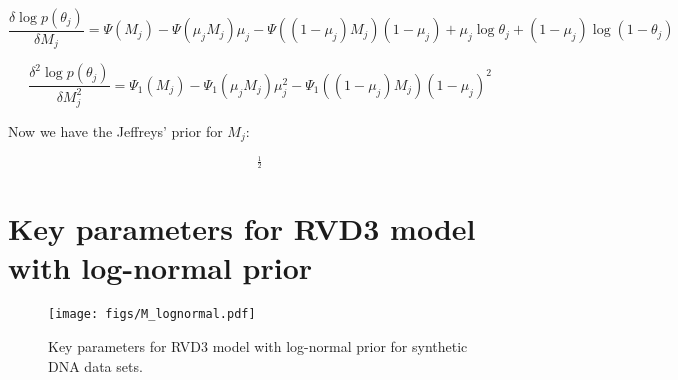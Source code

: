 \documentclass[11pt,reqno]{amsart}
\begin{document}
\begin{equation}
\frac{\delta\log p(\theta_{j})}{\delta M_{j}} = \Psi(M_{j}) - \Psi(\mu_{j} M_{j})\mu_{j} - \Psi((1-\mu_{j})M_{j})(1-\mu_{j}) +\mu_{j}\log\theta_{j} + (1-\mu_{j})\log(1-\theta_{j})
\end{equation}

\begin{equation}
\frac{\delta^{2}\log p(\theta_{j})}{\delta M_{j}^{2}}  = \Psi_{1}(M_{j}) - \Psi_{1}(\mu_{j} M_{j})\mu_{j}^{2} - \Psi_{1}((1-\mu_{j})M_{j})(1-\mu_{j})^{2}
\end{equation}

Now we have the Jeffreys' prior for $M_{j}$:

\begin{equation}
[-\left(\Psi_{1}(M_{j}) - \Psi_{1}(\mu_{j} M_{j})\mu_{j}^{2} - \Psi_{1}((1-\mu_{j})M_{j}){(1-\mu_{j})^{2}}\right)]^{\frac{1}{2}}
\end{equation}

\section{Key parameters for RVD3 model with log-normal prior}\label{sec:appendix_mom}
\begin{figure}[htbp]
\begin{center}
\texttt{[image: figs/M\_lognormal.pdf]}
\caption{Key parameters for RVD3 model with log-normal prior for synthetic DNA data sets.}
\label{fig:M_lognormal}
\end{center}
\end{figure}



\end{document}
